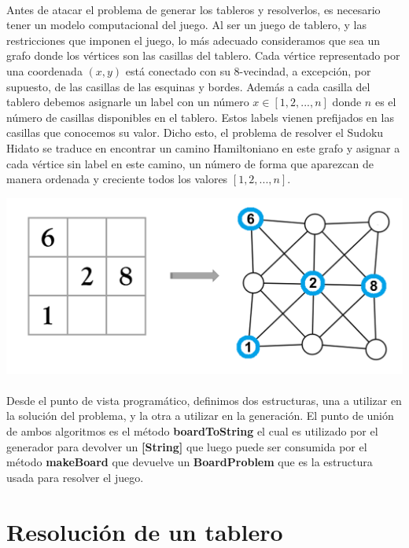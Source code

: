 \documentclass[a4paper, 12pt]{article}
\begin{document}
\paragraph{}
Antes de atacar el problema de generar los tableros y resolverlos, es necesario tener un modelo computacional
del juego. Al ser un juego de tablero, y las restricciones que imponen el juego, lo m\'as adecuado consideramos
que sea un grafo donde los v\'ertices son las casillas del tablero. Cada v\'ertice representado por una coordenada
$(x,y)$ está conectado con su 8-vecindad, a excepci\'on, por supuesto, de las casillas de las esquinas y bordes. Adem\'as a cada
casilla del tablero debemos asignarle un label con un n\'umero $x\in[1, 2, ..., n]$ donde $n$ es el n\'umero de casillas disponibles
en el tablero. Estos labels vienen prefijados en las casillas que conocemos su valor. Dicho esto, el problema de resolver el Sudoku
Hidato se traduce en encontrar un camino Hamiltoniano en este grafo y asignar a cada v\'ertice sin label en este camino, un n\'umero de
forma que aparezcan de manera ordenada y creciente todos los valores $[1, 2, ..., n]$.

\includegraphics[scale=.2]{HidatoToGraph.png}
\paragraph{}
Desde el punto de vista program\'atico, definimos dos estructuras, una a utilizar en la soluci\'on del problema,
y la otra a utilizar en la generaci\'on. El punto de uni\'on de ambos algoritmos es el m\'etodo \textbf{boardToString}
el cual es utilizado por el generador para devolver un \textbf{[String]} que luego puede ser consumida por el m\'etodo
\textbf{makeBoard} que devuelve un \textbf{BoardProblem} que es la estructura usada para resolver el juego.

\section*{Resoluci\'on de un tablero}
\end{document}

